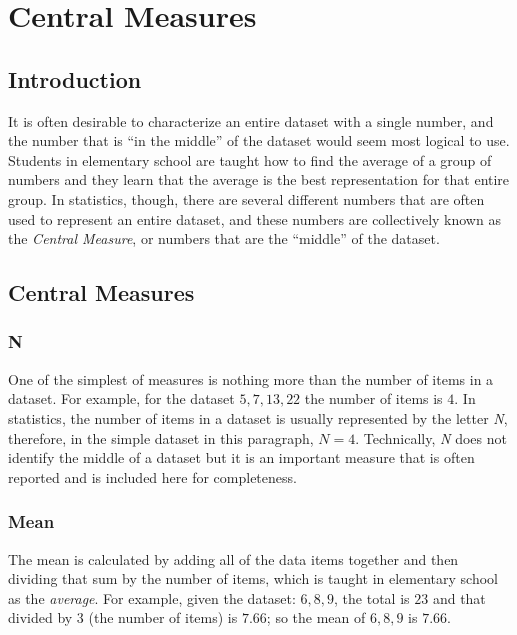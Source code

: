 \chapter{Central Measures}\label{cen:central_measures}

\section{Introduction}

It is often desirable to characterize an entire dataset with a single number, and the number that is ``in the middle'' of the dataset would seem most logical to use. Students in elementary school are taught how to find the average of a group of numbers and they learn that the average is the best representation for that entire group. In statistics, though, there are several different numbers that are often used to represent an entire dataset, and these numbers are collectively known as the \textit{Central Measure}, or numbers that are the ``middle'' of the dataset. 

\section{Central Measures}

\subsection{N}

One of the simplest of measures is nothing more than the number of items in a dataset. For example, for the dataset $ 5, 7, 13, 22 $ the number of items is $ 4 $. In statistics, the number of items in a dataset is usually represented by the letter \textit{N}, therefore, in the simple dataset in this paragraph, $ N = 4 $. Technically, \textit{N} does not identify the middle of a dataset but it is an important measure that is often reported and is included here for completeness.

\subsection{Mean}\label{cen:mean}

The mean is calculated by adding all of the data items together and then dividing that sum by the number of items, which is taught in elementary school as the \textit{average}. For example, given the dataset: $ 6, 8, 9 $, the total is $ 23 $ and that divided by $ 3 $ (the number of items) is $ 7.66 $; so the mean of $ 6, 8, 9 $ is $ 7.66 $.

